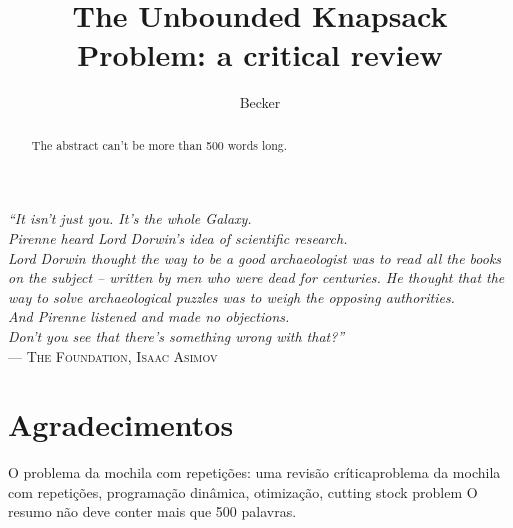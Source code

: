 \documentclass[ppgc,diss,english]{iiufrgs}
\title{The Unbounded Knapsack Problem: a critical review}
\author{Becker}{Henrique}
\begin{document}
\maketitle

\clearpage
\begin{flushright}
\mbox{}\vfill
{\sffamily\itshape
``It isn’t just you. It’s the whole Galaxy.\\
Pirenne heard Lord Dorwin’s idea of scientific research.\\
Lord Dorwin thought the way to be a good archaeologist was to read all the books on the subject -- written by men who were dead for centuries.
He thought that the way to solve archaeological puzzles was to weigh the opposing authorities.\\
And Pirenne listened and made no objections.\\
Don’t you see that there’s something wrong with that?''\\}
--- \textsc{The Foundation, Isaac Asimov}
\end{flushright}

\chapter*{Agradecimentos}

\begin{abstract}
The abstract can't be more than 500 words long.
\end{abstract}

\begin{englishabstract}{O problema da mochila com repetições: uma revisão crítica}{problema da mochila com repetições, programação dinâmica, otimização, cutting stock problem}
O resumo não deve conter mais que 500 palavras.
\end{englishabstract}
\end{document}
